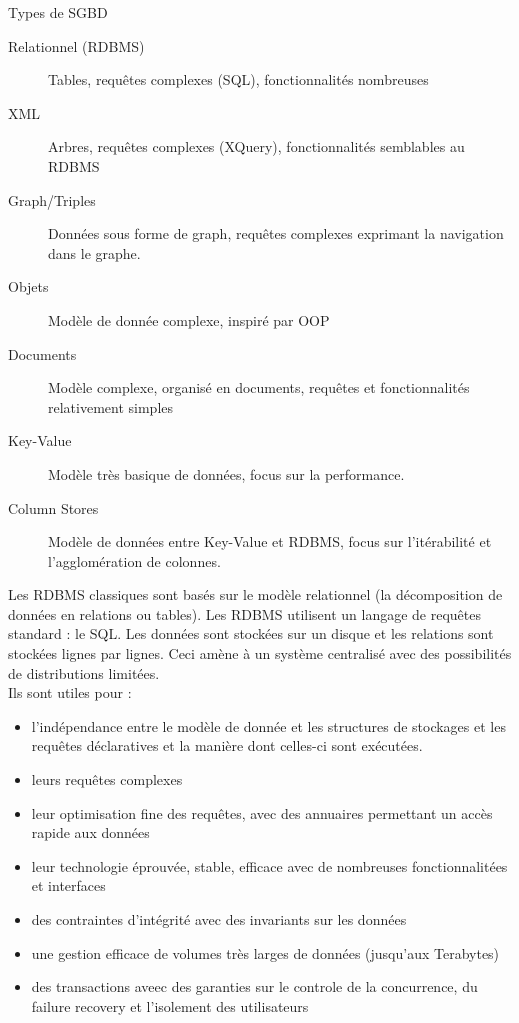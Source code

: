 \documentclass{cours}
\begin{document}
\begin{propositionfr}{Types de SGBD}{}
    \begin{description}
        \item[Relationnel (RDBMS)] Tables, requêtes complexes (SQL), fonctionnalités nombreuses
        \item[XML] Arbres, requêtes complexes (XQuery), fonctionnalités semblables au RDBMS
        \item[Graph/Triples] Données sous forme de graph, requêtes complexes exprimant la navigation dans le graphe.
        \item[Objets] Modèle de donnée complexe, inspiré par OOP
        \item[Documents] Modèle complexe, organisé en documents, requêtes et fonctionnalités relativement simples
        \item[Key-Value] Modèle très basique de données, focus sur la performance.
        \item[Column Stores] Modèle de données entre Key-Value et RDBMS, focus sur l'itérabilité et l'agglomération de colonnes.  
    \end{description}
\end{propositionfr}

Les RDBMS classiques sont basés sur le modèle relationnel (la décomposition de données en relations ou tables). Les RDBMS utilisent un langage de requêtes standard : le SQL. Les données sont stockées sur un disque et les relations sont stockées lignes par lignes. Ceci amène à un système centralisé avec des possibilités de distributions limitées.\\
Ils sont utiles pour :
\begin{itemize}
    \item l'indépendance entre le modèle de donnée et les structures de stockages et les requêtes déclaratives et la manière dont celles-ci sont exécutées.
    \item leurs requêtes complexes
    \item leur optimisation fine des requêtes, avec des annuaires permettant un accès rapide aux données
    \item leur technologie éprouvée, stable, efficace avec de nombreuses fonctionnalitées et interfaces
    \item des contraintes d'intégrité avec des invariants sur les données
    \item une gestion efficace de volumes très larges de données (jusqu'aux Terabytes)
    \item des transactions aveec des garanties sur le controle de la concurrence, du failure recovery et l'isolement des utilisateurs
\end{itemize} 
\end{document}
